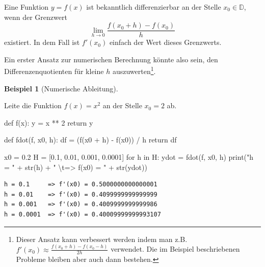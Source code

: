 \documentclass[
  letterpaper,
  DIV=11]{scrreprt}
\newenvironment{Shaded}{\begin{snugshade}}{\end{snugshade}}
\newcommand{\BuiltInTok}[1]{\textcolor[rgb]{0.00,0.23,0.31}{#1}}
\newcommand{\CharTok}[1]{\textcolor[rgb]{0.13,0.47,0.30}{#1}}
\newcommand{\ControlFlowTok}[1]{\textcolor[rgb]{0.00,0.23,0.31}{#1}}
\newcommand{\DecValTok}[1]{\textcolor[rgb]{0.68,0.00,0.00}{#1}}
\newcommand{\FloatTok}[1]{\textcolor[rgb]{0.68,0.00,0.00}{#1}}
\newcommand{\KeywordTok}[1]{\textcolor[rgb]{0.00,0.23,0.31}{#1}}
\newcommand{\NormalTok}[1]{\textcolor[rgb]{0.00,0.23,0.31}{#1}}
\newcommand{\OperatorTok}[1]{\textcolor[rgb]{0.37,0.37,0.37}{#1}}
\newcommand{\StringTok}[1]{\textcolor[rgb]{0.13,0.47,0.30}{#1}}
\theoremstyle{definition}
\newtheorem{example}{Beispiel}[chapter]
\theoremstyle{remark}
\begin{document}
Eine Funktion \(y = f(x)\) ist bekanntlich differenzierbar an der Stelle
\(x_0 \in \mathbb{D}\), wenn der Grenzwert
\[ \lim_{h\rightarrow 0} \frac{f(x_0 + h) - f(x_0)}{h} \] existiert. In
dem Fall ist \(f'(x_0)\) einfach der Wert dieses Grenzwerts.

Ein erster Ansatz zur numerischen Berechnung könnte also sein, den
Differenzenquotienten für kleine \(h\) auszuwerten\footnote{Dieser
  Ansatz kann verbessert werden indem man z.B.
  \(f'(x_0) \approx \frac{f(x_0 + h) - f(x_0 - h)}{2h}\) verwendet. Die
  im Beispiel beschriebenen Probleme bleiben aber auch dann bestehen.}.

\leavevmode{}%
\begin{example}[Numerische Ableitung]\label{exm-numDiff}

Leite die Funktion \(f(x) = x^2\) an der Stelle \(x_0 = 2\) ab.

\begin{Shaded}
\begin{Highlighting}[]
\KeywordTok{def}\NormalTok{ f(x):}
\NormalTok{    y }\OperatorTok{=}\NormalTok{ x }\OperatorTok{**} \DecValTok{2}
    \ControlFlowTok{return}\NormalTok{ y}

\KeywordTok{def}\NormalTok{ fdot(f, x0, h):}
\NormalTok{    df }\OperatorTok{=}\NormalTok{ (f(x0 }\OperatorTok{+}\NormalTok{ h) }\OperatorTok{{-}}\NormalTok{ f(x0)) }\OperatorTok{/}\NormalTok{ h}
    \ControlFlowTok{return}\NormalTok{ df}

\NormalTok{x0 }\OperatorTok{=} \FloatTok{0.2}
\NormalTok{H }\OperatorTok{=}\NormalTok{ [}\FloatTok{0.1}\NormalTok{, }\FloatTok{0.01}\NormalTok{, }\FloatTok{0.001}\NormalTok{, }\FloatTok{0.0001}\NormalTok{]}
\ControlFlowTok{for}\NormalTok{ h }\KeywordTok{in}\NormalTok{ H:}
\NormalTok{    ydot }\OperatorTok{=}\NormalTok{ fdot(f, x0, h)}
    \BuiltInTok{print}\NormalTok{(}\StringTok{"h = "} \OperatorTok{+} \BuiltInTok{str}\NormalTok{(h) }\OperatorTok{+} \StringTok{" }\CharTok{\textbackslash{}t}\StringTok{=\textgreater{} f\textquotesingle{}(x0) = "} \OperatorTok{+} \BuiltInTok{str}\NormalTok{(ydot))}
\end{Highlighting}
\end{Shaded}

\begin{verbatim}
h = 0.1     => f'(x0) = 0.5000000000000001
h = 0.01    => f'(x0) = 0.4099999999999999
h = 0.001   => f'(x0) = 0.4009999999999986
h = 0.0001  => f'(x0) = 0.40009999999993107
\end{verbatim}


\end{example}
\end{document}

